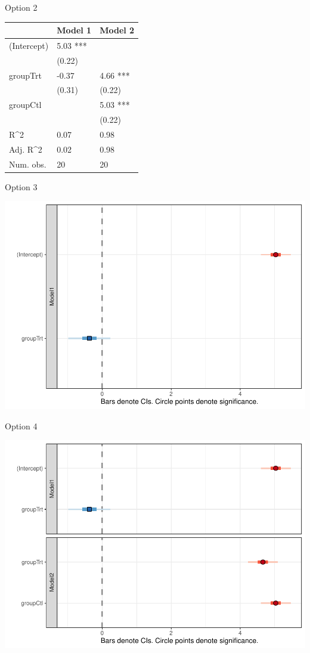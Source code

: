 \documentclass[
  english,
  man,floatsintext]{apa6}
\begin{document}
Option 2

\begin{tabular}{l|l|l}
\hline
 & Model 1 & Model 2\\
\hline
(Intercept) & 5.03 *** & \\
\hline
 & (0.22) & \\
\hline
groupTrt & -0.37 & 4.66 ***\\
\hline
 & (0.31) & (0.22)\\
\hline
groupCtl &  & 5.03 ***\\
\hline
 &  & (0.22)\\
\hline
R\textasciicircum{}2 & 0.07 & 0.98\\
\hline
Adj. R\textasciicircum{}2 & 0.02 & 0.98\\
\hline
Num. obs. & 20 & 20\\
\hline
\end{tabular}

Option 3

\includegraphics{SNA4DSprojectReport_files/figure-latex/model 3-1.pdf}

Option 4

\includegraphics{SNA4DSprojectReport_files/figure-latex/model 4-1.pdf}
\end{document}
